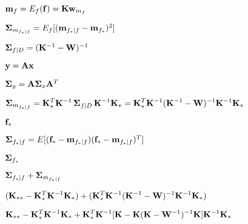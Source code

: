 \documentclass{article}
\def\lthtmlcheckvsize{\ifdim\ht\sizebox<\vsize 
  \ifdim\wd\sizebox<\hsize\expandafter\hfill\fi \expandafter\vfill
  \else\expandafter\vss\fi}%
\begin{document}
{\newpage\clearpage
{}%
$ {\bf m}_f=E_f({\bf f})={\bf K}{\bf w}_{m_f}$%
\lthtmlindisplaymathZ
\lthtmlcheckvsize\clearpage}

{\newpage\clearpage
{}%
$ {\bf\Sigma}_{m_{f_*|f}}=E_f[({\bf m}_{f_*|f}-{\bf m}_{f_*})^2]$%
\lthtmlindisplaymathZ
\lthtmlcheckvsize\clearpage}

{\newpage\clearpage
{}%
$ {\bf\Sigma}_{f|D}=({\bf K}^{-1}-{\bf W})^{-1}$%
\lthtmlindisplaymathZ
\lthtmlcheckvsize\clearpage}

{\newpage\clearpage
{}%
$ {\bf y}={\bf Ax}$%
\lthtmlindisplaymathZ
\lthtmlcheckvsize\clearpage}

{\newpage\clearpage
{}%
$ {\bf\Sigma}_y={\bf A\Sigma}_x{\bf A}^T$%
\lthtmlindisplaymathZ
\lthtmlcheckvsize\clearpage}

{\newpage\clearpage
{}%
$\displaystyle {\bf\Sigma}_{m_{f_*|f}}
={\bf K}_*^T {\bf K}^{-1}\,{\bf\Sigma}_{f|D} \,{\bf K}^{-1}{\bf K}_*
={\bf K}_*^T {\bf K}^{-1} ({\bf K}^{-1}-{\bf W})^{-1} {\bf K}^{-1}{\bf K}_*$%
\lthtmlindisplaymathZ
\lthtmlcheckvsize\clearpage}

{\newpage\clearpage
{}%
$ {\bf f}_*$%
\lthtmlindisplaymathZ
\lthtmlcheckvsize\clearpage}

{\newpage\clearpage
{}%
$ {\bf\Sigma}_{f_*|f}=E[({\bf f}_*-{\bf m}_{f_*|f})({\bf f}_*-{\bf m}_{f_*|f})^T]$%
\lthtmlindisplaymathZ
\lthtmlcheckvsize\clearpage}

{\newpage\clearpage
{}%
$\displaystyle {\bf\Sigma}_{f_*}$%
\lthtmlindisplaymathZ
\lthtmlcheckvsize\clearpage}

{\newpage\clearpage
{}%
$\displaystyle {\bf\Sigma}_{f_*|f}+{\bf\Sigma}_{m_{f_*|f}}$%
\lthtmlindisplaymathZ
\lthtmlcheckvsize\clearpage}

{\newpage\clearpage
{}%
$\displaystyle ({\bf K}_{**}-{\bf K}_*^T{\bf K}^{-1}{\bf K}_*)
+({\bf K}_*^T{\bf K}^{-1}({\bf K}^{-1}-{\bf W})^{-1}{\bf K}^{-1}{\bf K}_*)$%
\lthtmlindisplaymathZ
\lthtmlcheckvsize\clearpage}

{\newpage\clearpage
{}%
$\displaystyle {\bf K}_{**}-{\bf K}_*^T{\bf K}^{-1}{\bf K}_*
+{\bf K}_*^T{\bf K}^{-1} [{\bf K}-{\bf K}({\bf K}-{\bf W}^{-1})^{-1}{\bf K}]{\bf K}^{-1}{\bf K}_*$%
\lthtmlindisplaymathZ
\lthtmlcheckvsize\clearpage}
\end{document}
